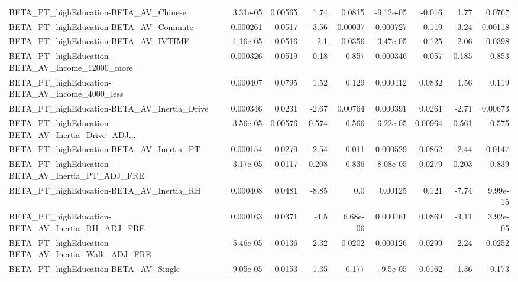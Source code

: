 \begin{tabular}{lrrrrrrrr}
BETA\_PT\_highEducation-BETA\_AV\_Chinese              &    3.31e-05 &      0.00565 &     1.74 &   0.0815 &  -9.12e-05 &      -0.016 &         1.77 &        0.0767 \\
BETA\_PT\_highEducation-BETA\_AV\_Commute              &    0.000261 &       0.0517 &    -3.56 &  0.00037 &   0.000727 &       0.119 &        -3.24 &       0.00118 \\
BETA\_PT\_highEducation-BETA\_AV\_IVTIME               &   -1.16e-05 &      -0.0516 &      2.1 &   0.0356 &  -3.47e-05 &      -0.125 &         2.06 &        0.0398 \\
BETA\_PT\_highEducation-BETA\_AV\_Income\_12000\_more    &   -0.000326 &      -0.0519 &     0.18 &    0.857 &  -0.000346 &      -0.057 &        0.185 &         0.853 \\
BETA\_PT\_highEducation-BETA\_AV\_Income\_4000\_less     &    0.000407 &       0.0795 &     1.52 &    0.129 &   0.000412 &      0.0832 &         1.56 &         0.119 \\
BETA\_PT\_highEducation-BETA\_AV\_Inertia\_Drive        &    0.000346 &       0.0231 &    -2.67 &  0.00764 &   0.000391 &      0.0261 &        -2.71 &       0.00673 \\
BETA\_PT\_highEducation-BETA\_AV\_Inertia\_Drive\_ADJ... &    3.56e-05 &      0.00576 &   -0.574 &    0.566 &   6.22e-05 &     0.00964 &       -0.561 &         0.575 \\
BETA\_PT\_highEducation-BETA\_AV\_Inertia\_PT           &    0.000154 &       0.0279 &    -2.54 &    0.011 &   0.000529 &      0.0862 &        -2.44 &        0.0147 \\
BETA\_PT\_highEducation-BETA\_AV\_Inertia\_PT\_ADJ\_FRE   &    3.17e-05 &       0.0117 &    0.208 &    0.836 &   8.08e-05 &      0.0279 &        0.203 &         0.839 \\
BETA\_PT\_highEducation-BETA\_AV\_Inertia\_RH           &    0.000408 &       0.0481 &    -8.85 &      0.0 &    0.00125 &       0.121 &        -7.74 &      9.99e-15 \\
BETA\_PT\_highEducation-BETA\_AV\_Inertia\_RH\_ADJ\_FRE   &    0.000163 &       0.0371 &     -4.5 & 6.68e-06 &   0.000461 &      0.0869 &        -4.11 &      3.92e-05 \\
BETA\_PT\_highEducation-BETA\_AV\_Inertia\_Walk\_ADJ\_FRE &   -5.46e-05 &      -0.0136 &     2.32 &   0.0202 &  -0.000126 &     -0.0299 &         2.24 &        0.0252 \\
BETA\_PT\_highEducation-BETA\_AV\_Single               &   -9.05e-05 &      -0.0153 &     1.35 &    0.177 &   -9.5e-05 &     -0.0162 &         1.36 &         0.173 \\

\end{tabular}
